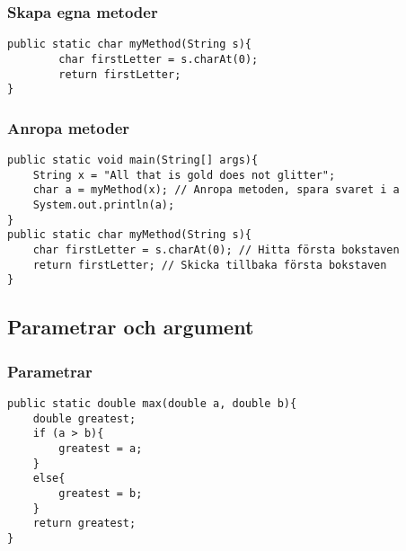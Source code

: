 \documentclass[aspectratio=169]{beamer}
\begin{document}
\begin{frame}[fragile]
    \frametitle{Skapa egna metoder}


    \begin{lstlisting}
public static char myMethod(String s){
        char firstLetter = s.charAt(0);
        return firstLetter;
}
    \end{lstlisting}


\end{frame}

\begin{frame}[fragile]
    \frametitle{Anropa metoder}

    \begin{lstlisting}
public static void main(String[] args){
    String x = "All that is gold does not glitter";
    char a = myMethod(x); // Anropa metoden, spara svaret i a
    System.out.println(a);
}
public static char myMethod(String s){
    char firstLetter = s.charAt(0); // Hitta första bokstaven
    return firstLetter; // Skicka tillbaka första bokstaven
}
    \end{lstlisting}

\end{frame}

\subsection{Parametrar och argument}

\begin{frame}[fragile]
    \frametitle{Parametrar}


    \begin{lstlisting}
public static double max(double a, double b){
    double greatest;
    if (a > b){
        greatest = a;
    }
    else{
        greatest = b;
    }
    return greatest;
}
    \end{lstlisting}

\end{frame}
\end{document}

